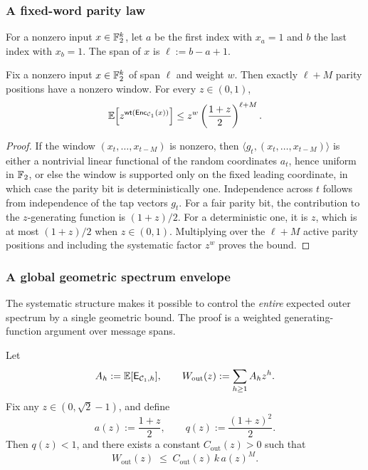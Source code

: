 \subsubsection{A fixed-word parity law}
\label{sec:outer-dense-fixedword}

\begin{definition}[Span]
For a nonzero input \(x\in\mathbb{F}_2^k\), let \(a\) be the first index with \(x_a=1\) and \(b\) the last index with \(x_b=1\).
The span of \(x\) is \(\ell:=b-a+1\).
\end{definition}

\begin{lemma}
\label{lem:outer-span-binomial}
Fix a nonzero input \(x\in\mathbb{F}_2^k\) of span \(\ell\) and weight \(w\).
Then exactly \(\ell+M\) parity positions have a nonzero window. For every \(z\in(0,1)\),
\[
\mathbb{E}\!\left[z^{\mathsf{wt}(\mathsf{Enc}_{{\mathcal{C}_1}}(x))}\right]
\le
z^w\left(\frac{1+z}{2}\right)^{\ell+M}.
\]
\end{lemma}

\begin{proof}
If the window \((x_t,\dots,x_{t-M})\) is nonzero, then
\(\langle g_t,(x_t,\dots,x_{t-M})\rangle\) is either a nontrivial linear functional of the random coordinates
\(a_t\), hence uniform in \(\mathbb{F}_2\), or else the window is supported only on the fixed leading coordinate, in which case
the parity bit is deterministically one.
Independence across \(t\) follows from independence of the tap vectors \(g_t\).
For a fair parity bit, the contribution to the \(z\)-generating function is \((1+z)/2\). For a deterministic one, it
is \(z\), which is at most \((1+z)/2\) when \(z\in(0,1)\). Multiplying over the \(\ell+M\) active parity positions and
including the systematic factor \(z^w\) proves the bound.
\end{proof}

\subsubsection{A global geometric spectrum envelope}
\label{sec:outer-dense-spectrum}

The systematic structure makes it possible to control the \emph{entire} expected outer spectrum by a single geometric
bound.
The proof is a weighted generating-function argument over message spans.

\begin{theorem}
\label{thm:outer-dense-generating}
Let
\[
A_h := \mathbb{E}[\mathsf{E}_{{\mathcal{C}_1},h}],
\qquad
W_{\mathrm{out}}(z):=\sum_{h\ge 1} A_h z^h.
\]
Fix any \(z\in(0,\sqrt2-1)\), and define
\[
a(z):=\frac{1+z}{2},
\qquad
q(z):=\frac{(1+z)^2}{2}.
\]
Then \(q(z)<1\), and there exists a constant \(C_{\mathrm{out}}(z)>0\) such that
\begin{equation}
\label{eq:outer-dense-gf-bound}
W_{\mathrm{out}}(z)
\;\le\;
C_{\mathrm{out}}(z)\, k\, a(z)^M.
\end{equation}
\end{theorem}

